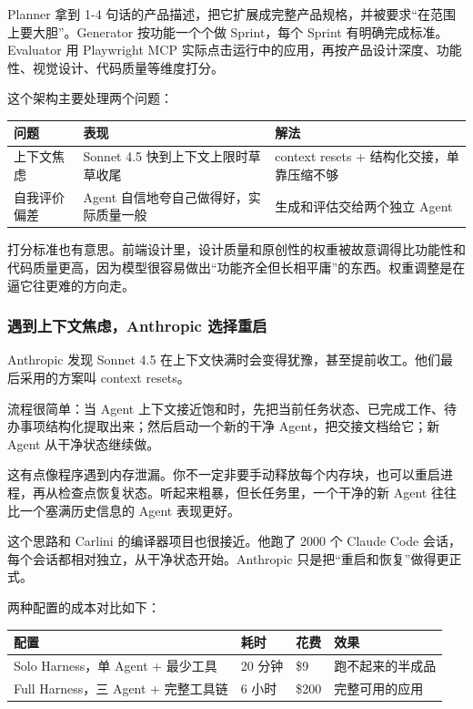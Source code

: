 \documentclass[10pt,a4paper]{ctexart}
\begin{document}
Planner 拿到 1-4 句话的产品描述，把它扩展成完整产品规格，并被要求“在范围上要大胆”。Generator 按功能一个个做 Sprint，每个 Sprint 有明确完成标准。Evaluator 用 Playwright MCP 实际点击运行中的应用，再按产品设计深度、功能性、视觉设计、代码质量等维度打分。



这个架构主要处理两个问题：


{\footnotesize
\begin{tabularx}{\textwidth}{|X|X|X|}
\hline
\textbf{问题} & \textbf{表现} & \textbf{解法} \\
\hline
上下文焦虑 & Sonnet 4.5 快到上下文上限时草草收尾 & context resets + 结构化交接，单靠压缩不够 \\
\hline
自我评价偏差 & Agent 自信地夸自己做得好，实际质量一般 & 生成和评估交给两个独立 Agent \\
\hline
\end{tabularx}
}



打分标准也有意思。前端设计里，设计质量和原创性的权重被故意调得比功能性和代码质量更高，因为模型很容易做出“功能齐全但长相平庸”的东西。权重调整是在逼它往更难的方向走。



\subsubsection{遇到上下文焦虑，Anthropic 选择重启}


Anthropic 发现 Sonnet 4.5 在上下文快满时会变得犹豫，甚至提前收工。他们最后采用的方案叫 context resets。



流程很简单：当 Agent 上下文接近饱和时，先把当前任务状态、已完成工作、待办事项结构化提取出来；然后启动一个新的干净 Agent，把交接文档给它；新 Agent 从干净状态继续做。



这有点像程序遇到内存泄漏。你不一定非要手动释放每个内存块，也可以重启进程，再从检查点恢复状态。听起来粗暴，但长任务里，一个干净的新 Agent 往往比一个塞满历史信息的 Agent 表现更好。



这个思路和 Carlini 的编译器项目也很接近。他跑了 2000 个 Claude Code 会话，每个会话都相对独立，从干净状态开始。Anthropic 只是把“重启和恢复”做得更正式。



两种配置的成本对比如下：


{\footnotesize
\begin{tabularx}{\textwidth}{|X|X|X|X|}
\hline
\textbf{配置} & \textbf{耗时} & \textbf{花费} & \textbf{效果} \\
\hline
Solo Harness，单 Agent + 最少工具 & 20 分钟 & \$9 & 跑不起来的半成品 \\
\hline
Full Harness，三 Agent + 完整工具链 & 6 小时 & \$200 & 完整可用的应用 \\
\hline
\end{tabularx}
}
\end{document}
